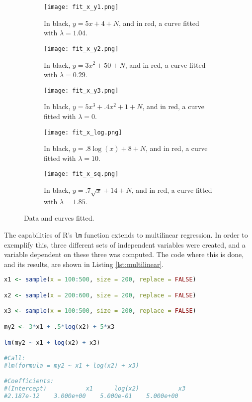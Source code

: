 \documentclass[letterpaper, 10 pt, conference]{article}
\begin{document}
\begin{figure}
	\centering
	\begin{subfigure}{0.3\linewidth}
		\texttt{[image: fit\_x\_y1.png]}
		\caption{In black, $y = 5x+4+ N$, and in red, a curve fitted with $\lambda = 1.04$.}
		\label{fig:fits_xy_1}
	\end{subfigure}
	\hfill
	\begin{subfigure}{0.3\linewidth}
		\texttt{[image: fit\_x\_y2.png]}
		\caption{In black, $y = 3x^2 + 50 + N$, and in red, a curve fitted with $\lambda = 0.29$.}
		\label{fig:fits_xy_2}
	\end{subfigure}
	\hfill
	\begin{subfigure}{0.3\linewidth}
		\texttt{[image: fit\_x\_y3.png]}
    	\caption{In black, $y = 5x^3 + .4 x^2 + 1 + N$, and in red, a curve fitted with $\lambda = 0$.}
		\label{fig:fits_xy_3}
	\end{subfigure}
	\begin{subfigure}{0.45\linewidth}
		\texttt{[image: fit\_x\_log.png]}
		\caption{In black, $y = .8 \log(x) + 8 + N$, and in red, a curve fitted with $\lambda = 10$.}
		\label{fig:fits_xy_log}
	\end{subfigure}
	\hfill
	\begin{subfigure}{0.45\linewidth}
		\texttt{[image: fit\_x\_sq.png]}
		\caption{In black, $y = .7 \sqrt{x} + 14 +N $, and in red, a curve fitted with $\lambda = 1.85$.}
		\label{fig:fits_xy_sq}
	\end{subfigure}
	\caption{Data and curves fitted.} 
	\label{fig:fits_xy}
\end{figure}

The capabilities of R's \texttt{lm} function extends to multilinear regression. In order to exemplify this, three different sets of independent variables were created, and a variable dependent on these three was computed. The code where this is done, and its results, are shown in Listing \ref{lst:multilinear}.
 
\begin{lstlisting}[language=R, caption={Multilinear regression with \texttt{lm}.}, label={lst:multilinear} ]
x1 <- sample(x = 100:500, size = 200, replace = FALSE)

x2 <- sample(x = 200:600, size = 200, replace = FALSE)

x3 <- sample(x = 100:500, size = 200, replace = FALSE)

my2 <- 3*x1 + .5*log(x2) + 5*x3

lm(my2 ~ x1 + log(x2) + x3)

#Call:
#lm(formula = my2 ~ x1 + log(x2) + x3)

#Coefficients:
#(Intercept)           x1      log(x2)           x3  
#2.187e-12    3.000e+00    5.000e-01    5.000e+00  
\end{lstlisting}
\end{document}
